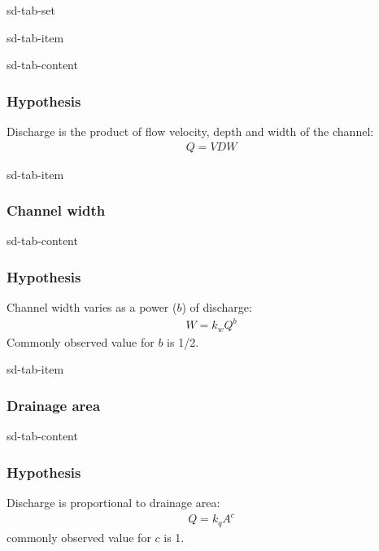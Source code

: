 \documentclass[letterpaper,10pt,english]{jupyterBook}
\begin{document}
\begin{sphinxuseclass}{sd-tab-set}
\begin{sphinxuseclass}{sd-tab-item}
\begin{sphinxuseclass}{sd-tab-content}\subsubsection*{Hypothesis}

\sphinxAtStartPar
Discharge is the product of flow velocity, depth and width of the channel:
\begin{equation*}
\begin{split}Q = VDW\end{split}
\end{equation*}
\end{sphinxuseclass}
\end{sphinxuseclass}
\begin{sphinxuseclass}{sd-tab-item}\subsubsection*{Channel width}

\begin{sphinxuseclass}{sd-tab-content}\subsubsection*{Hypothesis}

\sphinxAtStartPar
Channel width varies as a power (\(b\)) of discharge:
\begin{equation*}
\begin{split}W=k_wQ^b\end{split}
\end{equation*}
\sphinxAtStartPar
Commonly observed value for \(b\) is 1/2.

\end{sphinxuseclass}
\end{sphinxuseclass}
\begin{sphinxuseclass}{sd-tab-item}\subsubsection*{Drainage area}

\begin{sphinxuseclass}{sd-tab-content}\subsubsection*{Hypothesis}

\sphinxAtStartPar
Discharge is proportional to drainage area:
\begin{equation*}
\begin{split}Q = k_qA^c\end{split}
\end{equation*}
\sphinxAtStartPar
commonly observed value for \(c\) is 1.

\end{sphinxuseclass}
\end{sphinxuseclass}
\end{sphinxuseclass}
\end{document}

